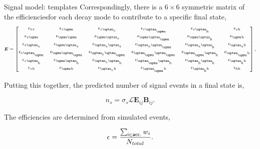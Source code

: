 \begin{frame}{Signal model: templates}
    Correspondingly, there is a $6\times6$ symmetric matrix of the efficiencies\footnotemark for each decay mode to contribute to a specific final state,
    \begin{equation*}
    \footnotesize
    \boldsymbol{E} = \begin{bmatrix}
        \epsilon_{\Pe\Pe}       & \epsilon_{\Pe\PGm}        & \epsilon_{\Pe\PGte}       & \epsilon_{\Pe\PGtmu}          & \epsilon_{\Pe\PGth}       & \epsilon_{\Pe \mathrm{h}}   \\
        \epsilon_{\Pe\PGm}      & \epsilon_{\PGm\PGm}       & \epsilon_{\PGm\PGte}      & \epsilon_{\PGm\PGtmu}         & \epsilon_{\PGm\PGth}      & \epsilon_{\PGm \mathrm{h}}  \\
        \epsilon_{\Pe\PGte}     & \epsilon_{\PGm\PGte}      & \epsilon_{\PGte\PGte}     & \epsilon_{\PGte\PGtmu}        & \epsilon_{\PGte\PGth}     & \epsilon_{\PGte \mathrm{h}} \\
        \epsilon_{\Pe\PGtmu}    & \epsilon_{\PGm\PGtmu}     & \epsilon_{\PGte\PGtmu}    & \epsilon_{\PGtmu\PGtmu}       & \epsilon_{\PGtmu\PGth}    & \epsilon_{\PGtmu \mathrm{h}}\\
        \epsilon_{\Pe\PGth}     & \epsilon_{\PGm\PGth}      & \epsilon_{\PGte\PGth}     & \epsilon_{\PGtmu\PGth}        & \epsilon_{\PGth\PGth}     & \epsilon_{\PGth \mathrm{h}} \\
        \epsilon_{\Pe\mathrm{h}}& \epsilon_{\PGm\mathrm{h}} & \epsilon_{\PGte\mathrm{h}}& \epsilon_{\PGtmu\mathrm{h}}   & \epsilon_{\PGth\mathrm{h}}& \epsilon_\mathrm{hh}        \\
    \end{bmatrix},
    \end{equation*}

    \begin{tcolorbox}{}
        \smaller\smaller
        Putting this together, the predicted number of signal events in a final state is,

        \begin{equation}
            \nonumber
            n_{s} = \sigma_{s} \mathcal{L} \mathbf{E}_{ij} \mathbf{B}_{ij}. 
        \end{equation}

        The efficiencies are determined from simulated events,

        \begin{equation}
            \nonumber
            \epsilon = \frac{\sum_{\sf i\in acc.}w_{i}}{N_{total}}.
        \end{equation}

    \end{tcolorbox}


\end{frame}


